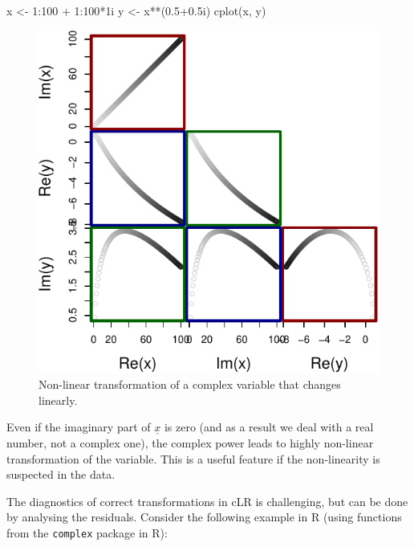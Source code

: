 \documentclass[
]{book}
\newenvironment{Shaded}{\begin{snugshade}}{\end{snugshade}}
\newcommand{\DecValTok}[1]{\textcolor[rgb]{0.00,0.00,0.81}{#1}}
\newcommand{\FloatTok}[1]{\textcolor[rgb]{0.00,0.00,0.81}{#1}}
\newcommand{\FunctionTok}[1]{\textcolor[rgb]{0.00,0.00,0.00}{#1}}
\newcommand{\NormalTok}[1]{#1}
\newcommand{\OtherTok}[1]{\textcolor[rgb]{0.56,0.35,0.01}{#1}}
\newcommand{\SpecialCharTok}[1]{\textcolor[rgb]{0.00,0.00,0.00}{#1}}
\begin{document}
\begin{Shaded}
\begin{Highlighting}[]
\NormalTok{x }\OtherTok{\textless{}{-}} \DecValTok{1}\SpecialCharTok{:}\DecValTok{100} \SpecialCharTok{+} \DecValTok{1}\SpecialCharTok{:}\DecValTok{100}\SpecialCharTok{*}\NormalTok{1i}
\NormalTok{y }\OtherTok{\textless{}{-}}\NormalTok{ x}\SpecialCharTok{**}\NormalTok{(}\FloatTok{0.5+0.5}\NormalTok{i)}
\FunctionTok{cplot}\NormalTok{(x, y)}
\end{Highlighting}
\end{Shaded}

\begin{figure}
\centering
\includegraphics{Svetunkov---Svetunkov---Complex-Valued-Econometrics_files/figure-latex/unnamed-chunk-34-1.pdf}
\caption{\label{fig:unnamed-chunk-34}Non-linear transformation of a complex variable that changes linearly.}
\end{figure}

Even if the imaginary part of \(\underline{x}\) is zero (and as a result we deal with a real number, not a complex one), the complex power leads to highly non-linear transformation of the variable. This is a useful feature if the non-linearity is suspected in the data.

The diagnostics of correct transformations in cLR is challenging, but can be done by analysing the residuals. Consider the following example in R (using functions from the \texttt{complex} package in R):
\end{document}
